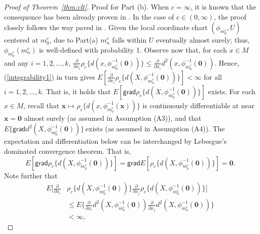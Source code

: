 \documentclass[preprint]{imsart}
\theoremstyle{plain}
\theoremstyle{remark}
\begin{document}
\begin{appendix}
\begin{proof}[Proof of Theorem~\ref{thm:clt}]
Proof for Part (b). When $c=\infty$, it is known that the consequence has been already proven in \citep{bhattacharya2003large, bhattacharya2005large}. In the case of $c \in (0, \infty)$, the proof closely follows the way paved in \cite{bhattacharya2003large, bhattacharya2005large, huckemann2011inference, jung2025averaging}. Given the local coordinate chart $(\phi_{m^{c}_0}, U)$ centered at $m^{c}_0$, due to Part(a) $m^{c}_{n}$ falls within $U$ eventually almost surely; thus, $\phi_{m^{c}_0}(m^{c}_{n})$ is well-defined with probability 1. Observe now that, for each $x \in M$ and any $i=1, 2, ..., k$, $\frac{\partial}{\partial x_i} \rho_{c}\{d(x, \phi_{m_{0}^{c}}^{-1}(\mathbf{0}))\} \le \frac{\partial}{\partial x_i} d^2(x, \phi_{m_{0}^{c}}^{-1}(\mathbf{0}))$. Hence, (\ref{integrability1}) in turn gives $E[\frac{\partial}{\partial x_i} \rho_{c}\{d(X, \phi_{m_{0}^{c}}^{-1}(\mathbf{0}))\}] < \infty$ for all $i=1,2, ..., k$. That is, it holds that $E[\textsf{grad}\rho_{c}\{d(X, \phi_{m_{0}^{c}}^{-1}(\mathbf{0}))\}]$ exists. For each $x \in M$, recall that $\mathbf{x} \mapsto \rho_{c}\{d(x, \phi^{-1}_{m^{c}_{0}}(\mathbf{x}))\}$ is continuously differentiable at near $\mathbf{x} = \mathbf{0}$ almost surely (as assumed in Assumption (A3)), and that $E\{\textsf{grad}d^2(X, \phi_{m_{0}^{c}}^{-1}(\mathbf{0}))\} ~ \mbox{exists}$ (as assumed in Assumption (A4)). The expectation and differentiation below can be interchanged by Lebesgue's dominated convergence theorem. That is,
\[
E[\textsf{grad}\rho_{c}\{d(X, \phi^{-1}_{m^{c}_{0}}(\mathbf{0}))\}] = \textsf{grad}E[\rho_{c}\{d(X, \phi^{-1}_{m^{c}_{0}}(\mathbf{0}))\}] = \mathbf{0}.
\]
Note further that
\begin{align*}
E[\frac{\partial}{\partial x_i} & \rho_{c}\{d(X, \phi_{m_{0}^{c}}^{-1}(\mathbf{0}))\}\frac{\partial}{\partial x_j} \rho_{c}\{d(X, \phi_{m_{0}^{c}}^{-1}(\mathbf{0}))\}] \\
&\le E\{\frac{\partial}{\partial x_i} d^2(X, \phi_{m_{0}^{c}}^{-1}(\mathbf{0}))\frac{\partial}{\partial x_j} d^2(X, \phi_{m_{0}^{c}}^{-1}(\mathbf{0}))\} \\ 
&< \infty,
\end{align*}

\end{proof}
\end{appendix}
\end{document}

